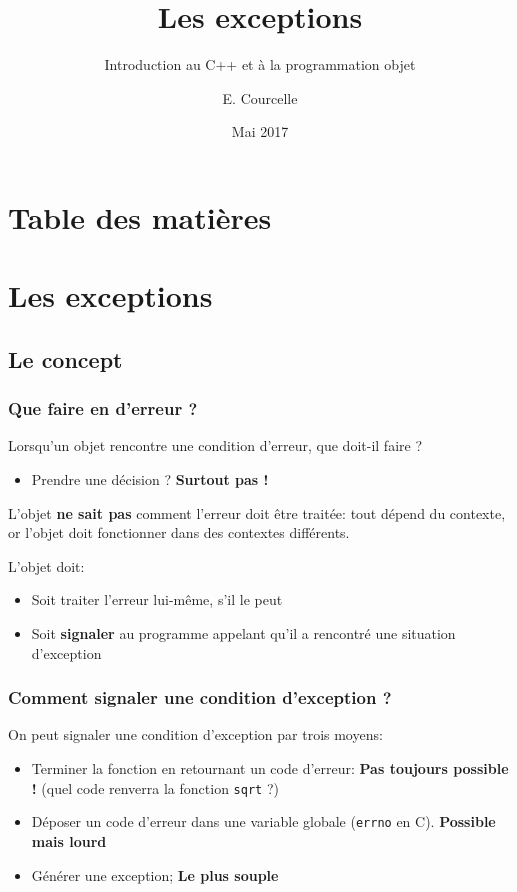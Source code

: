 \documentclass{beamer}
\title{Les exceptions}
\subtitle{Introduction au C++ et à la programmation objet}
\author{E. Courcelle}\institute{CALMIP, UMS 3669}
\date{Mai 2017}
\begin{document}
\begin{frame}
\titlepage
\end{frame}

\section*{Table des matières}
\begin{frame}
\tableofcontents
\end{frame}


\section{Les exceptions}

\subsection{Le concept}

\begin{frame}[fragile=singleslide,shrink=20]
\frametitle {Que faire en d'erreur ?}

Lorsqu'un objet rencontre une condition d'erreur, que doit-il faire ?
\begin{itemize}
\item{Prendre une décision ? \textbf{Surtout pas !}}
\end{itemize}

L'objet \textbf{ne sait pas} comment l'erreur doit être traitée: tout dépend du contexte, or l'objet doit fonctionner
dans des contextes différents.

L'objet doit:
\begin{itemize}
\item{Soit traiter l'erreur lui-même, s'il le peut}
\item{Soit \textbf{signaler } au programme appelant qu'il a rencontré une situation d'exception}
\end{itemize}
\end{frame}

\begin{frame}[fragile=singleslide,shrink=20]
\frametitle {Comment signaler une condition d'exception ?}

On peut signaler une condition d'exception par trois moyens:
\begin{itemize}
\item{Terminer la fonction en retournant un code d'erreur: \textbf{Pas toujours possible !} (quel code renverra la fonction \texttt{sqrt} ?)}
\item{Déposer un code d'erreur dans une variable globale (\texttt{errno} en C). \textbf{Possible mais lourd}}
\item{Générer une exception; \textbf{Le plus souple}}
\end{itemize}

\end{frame}
\end{document}
